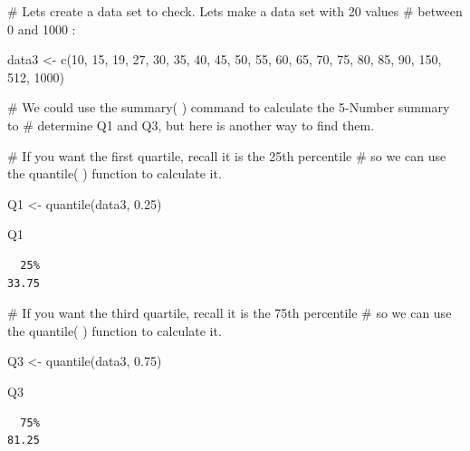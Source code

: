 \documentclass[
  letterpaper,
  DIV=11,
  numbers=noendperiod]{scrreprt}
\newenvironment{Shaded}{\begin{snugshade}}{\end{snugshade}}
\newcommand{\CommentTok}[1]{\textcolor[rgb]{0.37,0.37,0.37}{#1}}
\newcommand{\DecValTok}[1]{\textcolor[rgb]{0.68,0.00,0.00}{#1}}
\newcommand{\FloatTok}[1]{\textcolor[rgb]{0.68,0.00,0.00}{#1}}
\newcommand{\FunctionTok}[1]{\textcolor[rgb]{0.28,0.35,0.67}{#1}}
\newcommand{\NormalTok}[1]{\textcolor[rgb]{0.00,0.23,0.31}{#1}}
\newcommand{\OtherTok}[1]{\textcolor[rgb]{0.00,0.23,0.31}{#1}}
\begin{document}
\begin{Shaded}
\begin{Highlighting}[]
\CommentTok{\# Let\textquotesingle{}s create a data set to check. Let\textquotesingle{}s make a data set with 20 values }
\CommentTok{\# between 0 and 1000 :}


\NormalTok{data3 }\OtherTok{\textless{}{-}} \FunctionTok{c}\NormalTok{(}\DecValTok{10}\NormalTok{, }\DecValTok{15}\NormalTok{, }\DecValTok{19}\NormalTok{, }\DecValTok{27}\NormalTok{, }\DecValTok{30}\NormalTok{, }\DecValTok{35}\NormalTok{, }\DecValTok{40}\NormalTok{, }\DecValTok{45}\NormalTok{, }\DecValTok{50}\NormalTok{, }\DecValTok{55}\NormalTok{, }\DecValTok{60}\NormalTok{, }\DecValTok{65}\NormalTok{, }\DecValTok{70}\NormalTok{, }\DecValTok{75}\NormalTok{, }\DecValTok{80}\NormalTok{, }\DecValTok{85}\NormalTok{, }\DecValTok{90}\NormalTok{, }\DecValTok{150}\NormalTok{, }\DecValTok{512}\NormalTok{, }\DecValTok{1000}\NormalTok{)}

\CommentTok{\# We could use the summary( ) command to calculate the 5{-}Number summary to}
\CommentTok{\# determine Q1 and Q3, but here is another way to find them.}

\CommentTok{\# If you want the first quartile, recall it is the 25th percentile}
\CommentTok{\# so we can use the quantile( ) function to calculate it.}

\NormalTok{Q1 }\OtherTok{\textless{}{-}} \FunctionTok{quantile}\NormalTok{(data3, }\FloatTok{0.25}\NormalTok{)}

\NormalTok{Q1}
\end{Highlighting}
\end{Shaded}

\begin{verbatim}
  25% 
33.75 
\end{verbatim}

\begin{Shaded}
\begin{Highlighting}[]
\CommentTok{\# If you want the third quartile, recall it is the 75th percentile}
\CommentTok{\# so we can use the quantile( ) function to calculate it.}

\NormalTok{Q3 }\OtherTok{\textless{}{-}} \FunctionTok{quantile}\NormalTok{(data3, }\FloatTok{0.75}\NormalTok{)}

\NormalTok{Q3}
\end{Highlighting}
\end{Shaded}

\begin{verbatim}
  75% 
81.25 
\end{verbatim}
\end{document}
